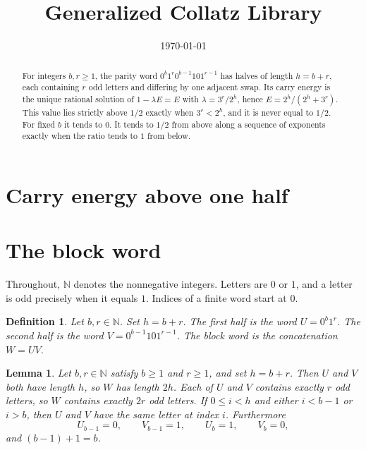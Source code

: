 \documentclass[11pt,letterpaper]{article}
\title{Generalized Collatz Library}
\author{}
\date{\today}
\newcommand{\N}{\mathbb{N}}
\newtheorem{lemma}[theorem]{Lemma}
\newtheorem{definition}[theorem]{Definition}
\begin{document}
\maketitle
\section*{Carry energy above one half}

\begin{abstract}
For integers \(b,r\geq 1\), the parity word \(0^{b}1^{r}0^{b-1}101^{r-1}\) has halves of length \(h=b+r\), each containing \(r\) odd letters and differing by one adjacent swap. Its carry energy is the unique rational solution of \(1-\lambda E=E\) with \(\lambda=3^{r}/2^{h}\), hence \(E=2^{h}/(2^{h}+3^{r})\). This value lies strictly above \(1/2\) exactly when \(3^{r}<2^{h}\), and it is never equal to \(1/2\). For fixed \(b\) it tends to \(0\). It tends to \(1/2\) from above along a sequence of exponents exactly when the ratio tends to \(1\) from below.
\end{abstract}

\section{The block word}

Throughout, \(\N\) denotes the nonnegative integers. Letters are \(0\) or \(1\), and a letter is odd precisely when it equals \(1\). Indices of a finite word start at \(0\).

\begin{definition}
\label{def:word}
Let \(b,r\in\N\). Set \(h=b+r\). The first half is the word \(U=0^{b}1^{r}\). The second half is the word \(V=0^{b-1}101^{r-1}\). The block word is the concatenation \(W=UV\).
\end{definition}

\begin{lemma}
\label{lem:shape}
Let \(b,r\in\N\) satisfy \(b\geq 1\) and \(r\geq 1\), and set \(h=b+r\). Then \(U\) and \(V\) both have length \(h\), so \(W\) has length \(2h\). Each of \(U\) and \(V\) contains exactly \(r\) odd letters, so \(W\) contains exactly \(2r\) odd letters. If \(0\leq i<h\) and either \(i<b-1\) or \(i>b\), then \(U\) and \(V\) have the same letter at index \(i\). Furthermore
\[
U_{b-1}=0,\qquad V_{b-1}=1,\qquad U_{b}=1,\qquad V_{b}=0,
\]
and \((b-1)+1=b\).
\end{lemma}
\end{document}
